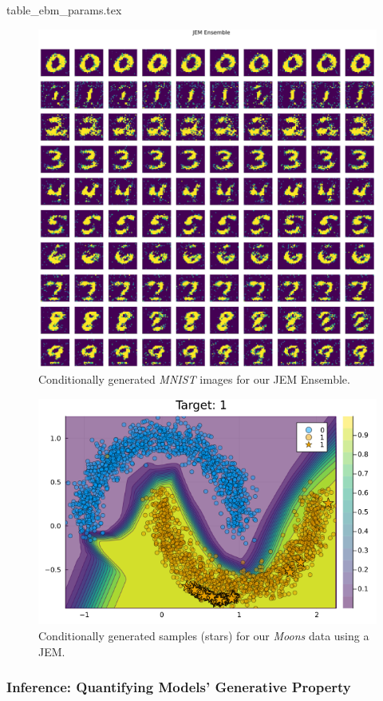 {table_ebm_params.tex}

\begin{figure}
  \centering
  \includegraphics[width=0.75\linewidth]{../www/mnist_generated_JEM Ensemble.png}
  \caption{Conditionally generated \textit{MNIST} images for our JEM Ensemble.}\label{fig:mnist-gen}
\end{figure}

\begin{figure}
  \centering
  \includegraphics[width=0.5\linewidth]{../www/moons_generated_JEM.png}
  \caption{Conditionally generated samples (stars) for our \textit{Moons} data using a JEM.}\label{fig:moons-gen}
\end{figure}
\subsubsection{Inference: Quantifying Models' Generative Property}

